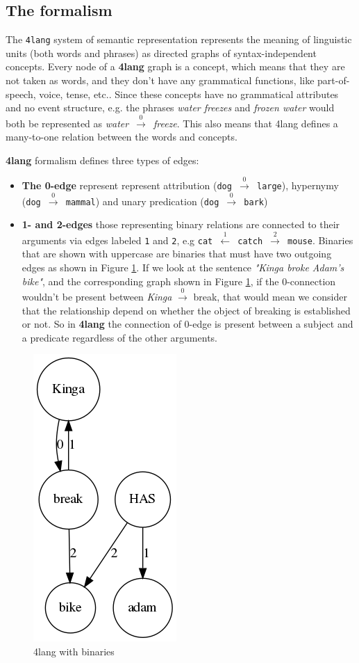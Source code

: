 \subsection{The formalism}
The \texttt{4lang} system of semantic representation \cite{Kornai:2015a}
represents the meaning of linguistic units (both words and phrases)
as directed graphs of syntax-independent concepts. Every node of a \textbf{4lang} graph is a concept, which means that they are not taken as words, and they don't have any grammatical functions, like part-of-speech, voice, tense, etc.\cite{Recski:2016}.
Since these concepts have no grammatical attributes and no event structure, e.g.
the phrases \textit{water freezes} and \textit{frozen water} would both be
represented as \textit{water}~$\xrightarrow0$~\textit{freeze}. This also means that 4lang defines a many-to-one relation between the words and concepts. 

\textbf{4lang} formalism defines three types of edges:
\begin{itemize}
	\item \textbf{The 0-edge} represent represent attribution (\texttt{dog
		$\xrightarrow0$ large}), hypernymy (\texttt{dog $\xrightarrow0$ mammal}) and unary predication (\texttt{dog  $\xrightarrow0$ bark})
	\item \textbf{1- and 2-edges} those representing binary relations are connected to their arguments
	via edges labeled \texttt{1} and \texttt{2}, e.g \texttt{cat $\xleftarrow1$ catch $\xrightarrow2$ mouse}. Binaries that are shown with uppercase are binaries that must have two outgoing edges as shown in Figure \ref{fig:4langbin}. If we look at the sentence \textit{"Kinga broke Adam's bike"}, and the corresponding graph shown in Figure \ref{fig:4langbin}, if the 0-connection wouldn't be present between \textit{Kinga} $\xrightarrow0$ break, that would mean we consider that the relationship depend on whether the object of breaking is established or not. So in \textbf{4lang} the connection of 0-edge is present between a subject and a predicate regardless of the other arguments.
\end{itemize}

\begin{figure}[h]
	\centering
	\includegraphics[height=0.5\textwidth]{figures/binary4lang}
	\caption{4lang with binaries}
	\label{fig:4langbin}
\end{figure}

